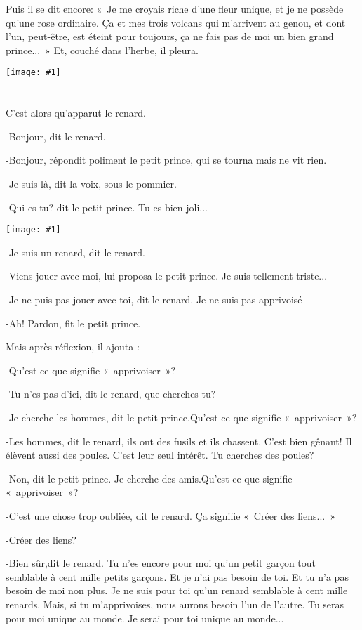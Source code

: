 \documentclass{report}
\newcommand{\parachapter}[2][]{\chapter[#1]{#2}}
\newcommand{\incpic}[1]{%
\begin{center}
    \texttt{[image: \#1]}
\end{center}%
}
\begin{document}
Puis il se dit encore: «~Je me croyais riche d'une fleur unique, et je ne possède qu'une rose ordinaire. Ça et mes trois volcans qui m'arrivent au genou, et dont l'un, peut-être, est éteint pour toujours, ça ne fais pas de moi un bien grand prince...~» Et, couché dans l'herbe, il pleura. 

\incpic{pic/image37.jpeg}

\parachapter{} %
C'est alors qu'apparut le renard.

-Bonjour, dit le renard.

-Bonjour, répondit poliment le petit prince, qui se tourna mais ne vit rien.

-Je suis là, dit la voix, sous le pommier.

-Qui es-tu? dit le petit prince. Tu es bien joli...

\incpic{pic/image38.jpeg}

-Je suis un renard, dit le renard.

-Viens jouer avec moi, lui proposa le petit prince. Je suis tellement triste...

-Je ne puis pas jouer avec toi, dit le renard. Je ne suis pas apprivoisé

-Ah! Pardon, fit le petit prince.

Mais après réflexion, il ajouta :

-Qu'est-ce que signifie «~apprivoiser~»?

-Tu n'es pas d'ici, dit le renard, que cherches-tu?

-Je cherche les hommes, dit le petit prince.Qu'est-ce que signifie «~apprivoiser~»?

-Les hommes, dit le renard, ils ont des fusils et ils chassent. C'est bien gênant! Il élèvent aussi des poules. C'est leur seul intérêt. Tu cherches des poules?

-Non, dit le petit prince. Je cherche des amis.Qu'est-ce que signifie «~apprivoiser~»?

-C'est une chose trop oubliée, dit le renard. Ça signifie «~Créer des liens...~»

-Créer des liens?

-Bien sûr,dit le renard. Tu n'es encore pour moi qu'un petit garçon tout semblable à cent mille petits garçons. Et je n'ai pas besoin de toi. Et tu n'a pas besoin de moi non plus. Je ne suis pour toi qu'un renard semblable à cent mille renards. Mais, si tu m'apprivoises, nous aurons besoin l'un de l'autre. Tu seras pour moi unique au monde. Je serai pour toi unique au monde...
\end{document}
